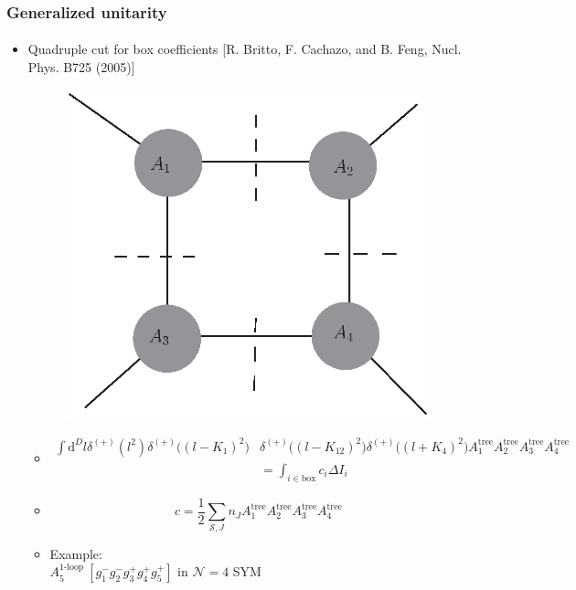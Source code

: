 \documentclass[english]{beamer}
\newcommand{\dd}{\textrm{d}}
\begin{document}
\begin{frame}[shrink=30]
\frametitle{Generalized unitarity}
\framesubtitle{}
\begin{itemize}
\item<1-> Quadruple cut for box coefficients
    \tiny\color{blue}
[R. Britto, F. Cachazo, and B. Feng, Nucl. Phys. B725 (2005)]
\color{black}\normalsize
\begin{figure}[h]
  \centering
  \includegraphics[width=0.3\linewidth]{quadruple_cut.eps}
\end{figure}%

\begin{itemize}

\item<2-> []
\small
\begin{equation*}
\begin{split}
\int\dd^D l \delta^{(+)}(l^2) \delta^{(+)}\big((l-K_1)^2\big)
& 
\delta^{(+)}\big((l-K_{12})^2\big)
\delta^{(+)}\big((l+K_4)^2\big)
A_1^{\mathrm{tree}}A_2^{\mathrm{tree}}A_3^{\mathrm{tree}}A_4^{\mathrm{tree}}
\\ & =
\int_{i\in\mathrm{box}} c_i \Delta I_i
\end{split}
\end{equation*} 
\normalsize

\item<3->[]
\begin{equation*}
c = \frac{1}{2}\sum_{\mathcal{S}, J}n_J A_1^{\mathrm{tree}}A_2^{\mathrm{tree}}A_3^{\mathrm{tree}}A_4^{\mathrm{tree}}
\end{equation*}

\item<4-> Example: \\ $A_5^{\textrm{1-loop }}[g_1^-g_2^-g_3^+g_4^+g_5^+]$ in $\mathcal{N}=4$ SYM 

\end{itemize}

\end{itemize}
\end{frame}
\end{document}
